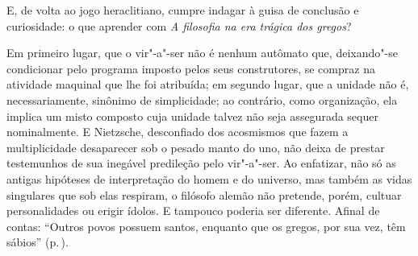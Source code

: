  E, de volta ao jogo heraclitiano, cumpre indagar à
 guisa de conclusão e curiosidade: o que aprender com \textit{A filosofia na
 era trágica dos gregos}?

Em primeiro lugar, que o vir"-a"-ser não é nenhum autômato que, deixando"-se
condicionar pelo programa imposto pelos seus construtores, se compraz na
atividade maquinal que lhe foi atribuída; em segundo lugar, que a unidade não
é, necessariamente, sinônimo de simplicidade; ao contrário, como organização,
ela implica um misto composto cuja unidade talvez não seja assegurada sequer
nominalmente. E Nietzsche, desconfiado dos acosmismos que fazem a
multiplicidade desaparecer sob o pesado manto do uno, não deixa de prestar
testemunhos de sua inegável predileção pelo vir"-a"-ser. Ao enfatizar, não só
as antigas hipóteses de interpretação do homem e do universo, mas também as
vidas singulares que sob elas respiram, o filósofo alemão não pretende,
porém, cultuar personalidades ou erigir ídolos. E tampouco poderia ser
diferente. Afinal de contas: ``Outros povos possuem santos, enquanto que os
gregos, por sua vez, têm sábios'' (p.\,\pageref{santos}).
